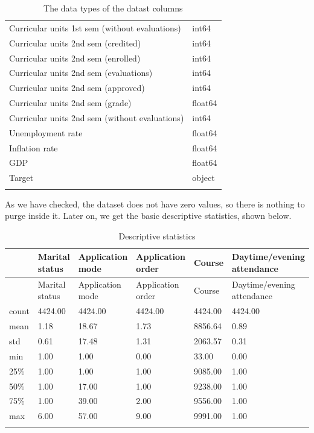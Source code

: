 \documentclass[
  letterpaper,
  DIV=11,
  numbers=noendperiod]{scrartcl}
\begin{document}
\begin{longtable}[]{@{}ll@{}}
Curricular units 1st sem (without evaluations) & int64 \\
Curricular units 2nd sem (credited) & int64 \\
Curricular units 2nd sem (enrolled) & int64 \\
Curricular units 2nd sem (evaluations) & int64 \\
Curricular units 2nd sem (approved) & int64 \\
Curricular units 2nd sem (grade) & float64 \\
Curricular units 2nd sem (without evaluations) & int64 \\
Unemployment rate & float64 \\
Inflation rate & float64 \\
GDP & float64 \\
Target & object \\
\caption{The data types of the datast columns }\tabularnewline
\end{longtable}

As we have checked, the dataset does not have zero values, so there is
nothing to purge inside it. Later on, we get the basic descriptive
statistics, shown below.

\hypertarget{tab-descstat-1}{}
\begin{longtable}[]{@{}llllll@{}}
\toprule\noalign{}
& Marital status & Application mode & Application order & Course &
Daytime/evening attendance \\
\midrule\noalign{}
\endfirsthead
\toprule\noalign{}
& Marital status & Application mode & Application order & Course &
Daytime/evening attendance \\
\midrule\noalign{}
\endhead
\bottomrule\noalign{}
\endlastfoot
count & 4424.00 & 4424.00 & 4424.00 & 4424.00 & 4424.00 \\
mean & 1.18 & 18.67 & 1.73 & 8856.64 & 0.89 \\
std & 0.61 & 17.48 & 1.31 & 2063.57 & 0.31 \\
min & 1.00 & 1.00 & 0.00 & 33.00 & 0.00 \\
25\% & 1.00 & 1.00 & 1.00 & 9085.00 & 1.00 \\
50\% & 1.00 & 17.00 & 1.00 & 9238.00 & 1.00 \\
75\% & 1.00 & 39.00 & 2.00 & 9556.00 & 1.00 \\
max & 6.00 & 57.00 & 9.00 & 9991.00 & 1.00 \\
\caption{Descriptive statistics }\tabularnewline
\end{longtable}
\end{document}
